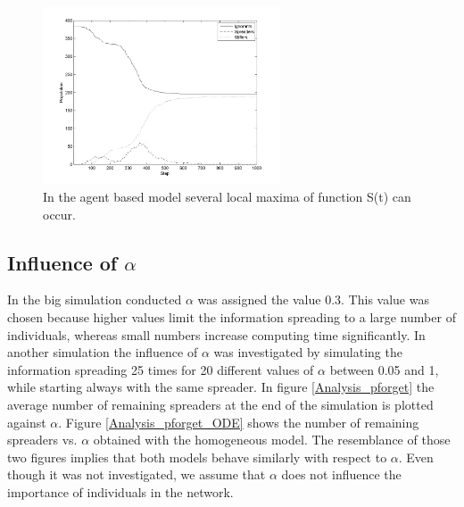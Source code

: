 \begin{figure}
\begin{center}
\includegraphics[width=7cm]{2-local-max}
\caption{In the agent based model several local maxima of function S(t) can occur.}
\label{2peaks}
\end{center}
\end{figure}

\subsection{Influence of $\alpha$}

In the big simulation conducted $\alpha$ was assigned the value 0.3. This value was chosen because higher values limit the information spreading to a large number of individuals, whereas small numbers increase computing time significantly. In another simulation the influence of $\alpha$ was investigated by simulating the information spreading 25 times for 20 different values of $\alpha$ between 0.05 and 1, while starting always with the same spreader. In figure \ref{Analysis_pforget} the average number of remaining spreaders at the end of the simulation is plotted against $\alpha$. Figure \ref{Analysis_pforget_ODE} shows the number of remaining spreaders vs. $\alpha$ obtained with the homogeneous model. The resemblance of those two figures implies that both models behave similarly with respect to $\alpha$. Even though  it was not investigated, we assume that $\alpha$ does not influence the importance of individuals in the network.

